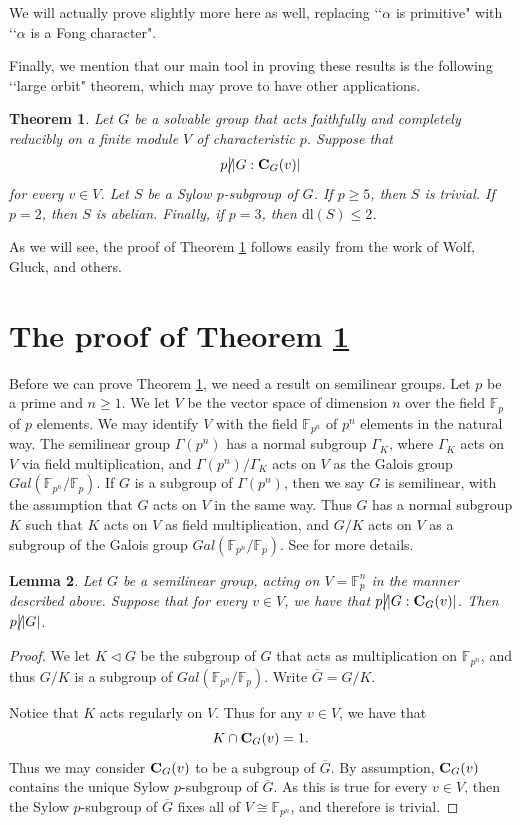 \documentclass[11pt]{amsart}
\newtheorem{theorem}{Theorem}[section]
\newtheorem{lemma}[theorem]{Lemma}
\newcommand \F {\mathbb F}
\newcommand{\dl}{\mathrm {dl}}
\newcommand \dvd {\hbox {\big|}}
\newcommand \ndvd {\hbox {/}\kern-5pt\dvd}
\newcommand \nrml {\lhd}
\newcommand \cent {{\bf{C}}}
\begin{document}
We will actually prove slightly more here as well, replacing \lq \lq $\alpha$ is primitive" with \lq \lq $\alpha$ is a Fong character".

Finally, we mention that our main tool in proving these results is the following \lq \lq large orbit" theorem, which may prove to have other applications.

\begin{theorem}\label{orbits}  Let $G$ be a solvable group that acts faithfully and completely reducibly on a finite module $V$ of characteristic $p$.  Suppose that $$p \ndvd |G : \cent_G(v)|$$ for every $v \in V$.   Let $S$ be a Sylow $p$-subgroup of $G$.  If $p \geq 5$, then $S$ is trivial.  If $p = 2$, then $S$ is abelian.  Finally, if $p=3$, then $\dl(S) \leq 2$.
\end{theorem}

As we will see, the proof of Theorem \ref{orbits} follows easily from the work of Wolf, Gluck, and others.

\section{The proof of Theorem \ref{orbits}}

Before we can prove Theorem \ref{orbits}, we need a result on semilinear groups.  Let $p$ be a prime and $n \geq 1$.  We let $V$ be the vector space of dimension $n$ over the field $\F_p$ of $p$ elements.  We may identify $V$ with the field $\F_{p^n}$ of $p^n$ elements in the natural way.  The semilinear group $\Gamma(p^n)$ has a normal subgroup $\Gamma_K$, where $\Gamma_K$ acts on $V$ via field multiplication, and $\Gamma(p^n)/\Gamma_K$ acts on $V$ as the Galois group $Gal(\F_{p^n}/\F_p)$.   If $G$ is a subgroup of $\Gamma(p^n)$, then we say $G$ is semilinear, with the assumption that $G$ acts on $V$ in the same way.  Thus $G$ has a normal subgroup $K$ such that $K$ acts on $V$ as field multiplication, and $G/K$ acts on $V$ as a subgroup of the Galois group $Gal(\F_{p^n}/\F_p)$.  See \cite{manzwolf} for more details.


\begin{lemma}\label{semilinearaction}  Let $G$ be a semilinear group, acting on $V = \F_p^n$ in the manner described above.  Suppose that for every $v \in V$, we have that $p \ndvd |G : \cent_G(v)|$.  Then $p \ndvd |G|$.
\end{lemma}

\begin{proof}  We let $K \nrml G$ be the subgroup of $G$ that acts as multiplication on $\F_{p^n}$, and thus $G/K$ is a subgroup of $Gal(\F_{p^n}/\F_p)$.  Write ${\overline{G}} = G/K$.

Notice that $K$ acts regularly on $V$.  Thus for any $v \in V$, we have that $$K \cap \cent_G(v) = 1.$$  Thus we may consider $\cent_G(v)$ to be a subgroup of ${\overline{G}}$.  By assumption, $\cent_G(v)$ contains the unique Sylow $p$-subgroup of ${\overline{G}}$.  As this is true for every $v \in V$, then the Sylow $p$-subgroup of $\overline{G}$ fixes all of $V \cong \F_{p^n}$, and therefore is trivial.
\end{proof}
\end{document}
